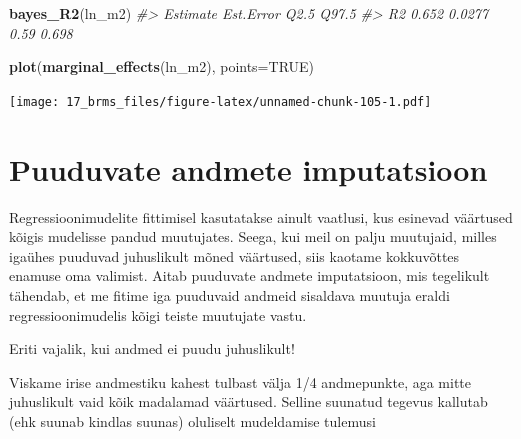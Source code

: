 \documentclass[]{book}
\newenvironment{Shaded}{\begin{snugshade}}{\end{snugshade}}
\newcommand{\CommentTok}[1]{\textcolor[rgb]{0.56,0.35,0.01}{\textit{#1}}}
\newcommand{\DataTypeTok}[1]{\textcolor[rgb]{0.13,0.29,0.53}{#1}}
\newcommand{\DecValTok}[1]{\textcolor[rgb]{0.00,0.00,0.81}{#1}}
\newcommand{\FloatTok}[1]{\textcolor[rgb]{0.00,0.00,0.81}{#1}}
\newcommand{\KeywordTok}[1]{\textcolor[rgb]{0.13,0.29,0.53}{\textbf{#1}}}
\newcommand{\NormalTok}[1]{#1}
\newcommand{\OperatorTok}[1]{\textcolor[rgb]{0.81,0.36,0.00}{\textbf{#1}}}
\newcommand{\OtherTok}[1]{\textcolor[rgb]{0.56,0.35,0.01}{#1}}
\newcommand{\StringTok}[1]{\textcolor[rgb]{0.31,0.60,0.02}{#1}}
\begin{document}
\begin{Shaded}
\begin{Highlighting}[]
\KeywordTok{bayes_R2}\NormalTok{(ln_m2)}
\CommentTok{#>    Estimate Est.Error Q2.5 Q97.5}
\CommentTok{#> R2    0.652    0.0277 0.59 0.698}
\end{Highlighting}
\end{Shaded}

\begin{Shaded}
\begin{Highlighting}[]
\KeywordTok{plot}\NormalTok{(}\KeywordTok{marginal_effects}\NormalTok{(ln_m2), }\DataTypeTok{points=}\OtherTok{TRUE}\NormalTok{)}
\end{Highlighting}
\end{Shaded}

\texttt{[image: 17\_brms\_files/figure-latex/unnamed-chunk-105-1.pdf]}

\hypertarget{puuduvate-andmete-imputatsioon}{%
\section{Puuduvate andmete imputatsioon}\label{puuduvate-andmete-imputatsioon}}

Regressioonimudelite fittimisel kasutatakse ainult vaatlusi, kus esinevad väärtused kõigis mudelisse pandud muutujates. Seega, kui meil on palju muutujaid, milles igaühes puuduvad juhuslikult mõned väärtused, siis kaotame kokkuvõttes enamuse oma valimist. Aitab puuduvate andmete imputatsioon, mis tegelikult tähendab, et me fitime iga puuduvaid andmeid sisaldava muutuja eraldi regressioonimudelis kõigi teiste muutujate vastu.

Eriti vajalik, kui andmed ei puudu juhuslikult!

Viskame irise andmestiku kahest tulbast välja 1/4 andmepunkte, aga mitte juhuslikult vaid kõik madalamad väärtused. Selline suunatud tegevus kallutab (ehk suunab kindlas suunas) oluliselt mudeldamise tulemusi

\begin{Shaded}
\end{Shaded}
\end{document}

